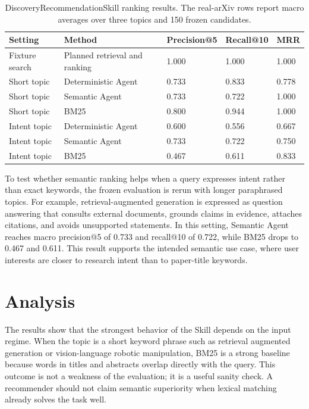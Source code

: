 \documentclass{article}
\begin{document}
\begin{table}[t]
  \centering
  \caption{DiscoveryRecommendationSkill ranking results. The real-arXiv rows report macro averages over three topics and 150 frozen candidates.}
  \label{tab:skill1-results}
  \small
  \begin{tabular}{@{}lllll@{}}
    \toprule
    Setting & Method & Precision@5 & Recall@10 & MRR \\
    \midrule
    Fixture search & Planned retrieval and ranking & 1.000 & 1.000 & 1.000 \\
    Short topic & Deterministic Agent & 0.733 & 0.833 & 0.778 \\
    Short topic & Semantic Agent & 0.733 & 0.722 & 1.000 \\
    Short topic & BM25 & 0.800 & 0.944 & 1.000 \\
    Intent topic & Deterministic Agent & 0.600 & 0.556 & 0.667 \\
    Intent topic & Semantic Agent & 0.733 & 0.722 & 0.750 \\
    Intent topic & BM25 & 0.467 & 0.611 & 0.833 \\
    \bottomrule
  \end{tabular}
\end{table}

To test whether semantic ranking helps when a query expresses intent rather than exact keywords, the frozen evaluation is rerun with longer paraphrased topics. For example, retrieval-augmented generation is expressed as question answering that consults external documents, grounds claims in evidence, attaches citations, and avoids unsupported statements. In this setting, Semantic Agent reaches macro precision@5 of 0.733 and recall@10 of 0.722, while BM25 drops to 0.467 and 0.611. This result supports the intended semantic use case, where user interests are closer to research intent than to paper-title keywords.

\section{Analysis}

The results show that the strongest behavior of the Skill depends on the input regime. When the topic is a short keyword phrase such as retrieval augmented generation or vision-language robotic manipulation, BM25 is a strong baseline because words in titles and abstracts overlap directly with the query. This outcome is not a weakness of the evaluation; it is a useful sanity check. A recommender should not claim semantic superiority when lexical matching already solves the task well.
\end{document}
